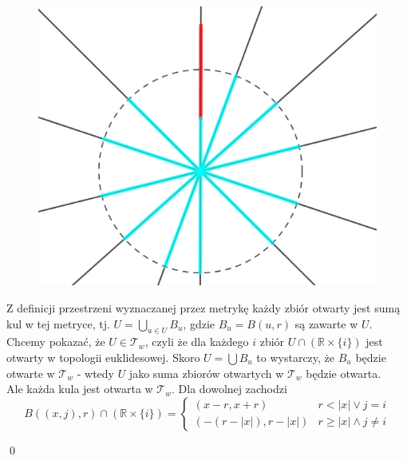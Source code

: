 \documentclass{article}
\theoremstyle{definition}%
\theoremstyle{theorem}
\renewenvironment{proof}{{\bfseries Rozwiązanie}}{\qed}
\newcommand{\R}{\mathbb{R}} %
\newcommand{\sT}{\mathcal{T}} %
\begin{document}
\begin{proof}
\begin{enumerate}
\begin{enumerate}
		 	\begin{figure}[H]
		 		\includegraphics{zad_toposlaba2}
		 		\centering
		 	\end{figure}
		 		\end{enumerate}
		 		Z definicji przestrzeni wyznaczanej przez metrykę każdy zbiór otwarty jest sumą kul w tej metryce, tj. $U=\bigcup_{u\in U } B_u$, gdzie $B_u = B(u,r)$ są zawarte w $U$. \\
		 		Chcemy pokazać, że $U\in \sT_w$, czyli że dla każdego $i$ zbiór $U\cap \left( \R\times\{i\}\right)$ jest otwarty w topologii euklidesowej. Skoro $U = \bigcup B_u$ to wystarczy, że $B_u$ będzie otwarte w $\sT_w$ - wtedy $U$ jako suma zbiorów otwartych w $\sT_w$ będzie otwarta. \\
		 		Ale każda kula jest otwarta w $\sT_w$. Dla dowolnej zachodzi 
		 		\[
		 		B((x,j),r) \cap \left(\R \times \{i\}\right) = \begin{cases}
		 		(x-r,x+r) & r < |x| \vee j = i \\
		 		(-(r-|x|),r-|x|) & r \geq |x| \wedge j \neq i
		 		

\end{cases}\]
\end{enumerate}
\end{proof}
\end{document}
